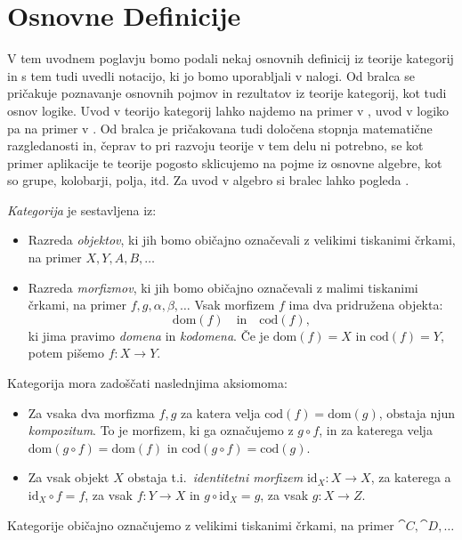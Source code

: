 \documentclass[../kategoricna_logika.tex]{subfiles}
\begin{document}
\section{
  Osnovne Definicije}
%
V tem uvodnem poglavju bomo podali nekaj osnovnih definicij iz
teorije kategorij in s tem tudi uvedli notacijo,
ki jo bomo uporabljali v nalogi.
Od bralca se pričakuje poznavanje osnovnih pojmov in rezultatov iz
teorije kategorij, kot tudi osnov logike.
Uvod v teorijo kategorij lahko najdemo na primer v \cite{taslak2017, riehl2017category},
uvod v logiko pa na primer v \cite{prijatelj1992osnove1}.
Od bralca je pričakovana tudi določena stopnja matematične razgledanosti
in, čeprav to pri razvoju teorije v tem delu ni potrebno, se kot
primer aplikacije te teorije pogosto sklicujemo na pojme iz
osnovne algebre, kot so grupe, kolobarji, polja, itd.
Za uvod v algebro si bralec lahko pogleda \cite{bresar2018uvod}.
\begin{definicija}
  \emph{Kategorija} je sestavljena iz:
  \begin{itemize}
  \item Razreda \emph{objektov}, ki jih bomo običajno označevali z
    velikimi tiskanimi črkami, na primer $X, Y, A, B, \ldots$
  \item Razreda \emph{morfizmov}, ki jih bomo običajno označevali z
    malimi tiskanimi črkami, na primer $f,g,\alpha,\beta, \ldots$
    Vsak morfizem $f$ ima dva pridružena objekta:
    \[ \mathrm{dom}(f) \quad \text{in} \quad \mathrm{cod}(f), \]
    ki jima pravimo \emph{domena} in \emph{kodomena}. Če je $\mathrm{dom}(f)=X$
    in ${\mathrm{cod}(f)=Y}$, potem pišemo $f : X \to Y$.
  \end{itemize}
  Kategorija mora zadoščati naslednjima aksiomoma:
  \begin{itemize}
  \item   Za vsaka dva morfizma $f,g$ za katera velja $\mathrm{cod}(f) = \mathrm{dom}(g)$,
  obstaja njun \emph{kompozitum}. To je morfizem, ki ga označujemo z $g \circ f$, in
  za katerega velja $\mathrm{dom}(g \circ f) = \mathrm{dom}(f)$ in
  $\mathrm{cod}(g \circ f) = \mathrm{cod}(g)$.
  \item Za vsak objekt $X$ obstaja t.i.\ \emph{identitetni morfizem}
  $\mathrm{id}_X : X \to X$, za katerega a $\mathrm{id}_X \circ f = f$,
  za vsak $f : Y \to X$ in $g \circ \mathrm{id}_X = g$, za vsak $g : X \to Z$.
\end{itemize}
Kategorije običajno označujemo z velikimi tiskanimi črkami, na primer $\cat{C}, \cat{D}, \ldots$
\end{definicija}
\end{document}
